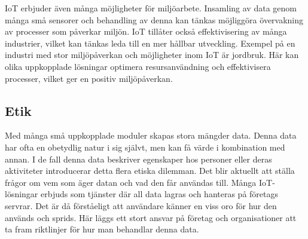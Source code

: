 IoT erbjuder även många möjligheter för miljöarbete. Insamling av data genom många små sensorer och behandling av denna kan tänkas möjliggöra övervakning av processer som påverkar miljön. IoT tillåter också effektivisering av många industrier, vilket kan tänkas leda till en mer hållbar utveckling. Exempel på en industri med stor miljöpåverkan och möjligheter inom IoT är jordbruk. Här kan olika uppkopplade lösningar optimera resursanvändning och effektivisera processer, vilket ger en positiv miljöpåverkan. \cite{IoT-agriculture}

\subsection{Etik}
Med många små uppkopplade moduler skapas stora mängder data. Denna data har ofta en obetydlig natur i sig självt, men kan få värde i kombination med annan. I de fall denna data beskriver egenskaper hos personer eller deras aktiviteter introducerar detta flera etiska dilemman. Det blir aktuellt att ställa frågor om vem som äger datan och vad den får användas till. Många IoT-lösningar erbjuds som tjänster där all data lagras och hanteras på företags servrar. Det är då förståeligt att användare känner en viss oro för hur den används och sprids. Här läggs ett stort ansvar på företag och organisationer att ta fram riktlinjer för hur man behandlar denna data.

%
